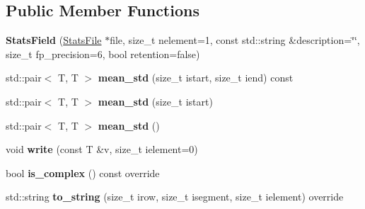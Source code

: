 \subsection*{Public Member Functions}
\begin{DoxyCompactItemize}
\item 
{\bfseries Stats\+Field} (\hyperlink{classStatsFile}{Stats\+File} $\ast$file, size\+\_\+t nelement=1, const std\+::string \&description=\char`\"{}\char`\"{}, size\+\_\+t fp\+\_\+precision=6, bool retention=false)\hypertarget{classStatsField_a93e5b0b232dc5f159b997a2e4ed88fff}{}\label{classStatsField_a93e5b0b232dc5f159b997a2e4ed88fff}

\item 
std\+::pair$<$ T, T $>$ {\bfseries mean\+\_\+std} (size\+\_\+t istart, size\+\_\+t iend) const \hypertarget{classStatsField_a2f7d28bb0e3097b372a3d5229e591e1a}{}\label{classStatsField_a2f7d28bb0e3097b372a3d5229e591e1a}

\item 
std\+::pair$<$ T, T $>$ {\bfseries mean\+\_\+std} (size\+\_\+t istart)\hypertarget{classStatsField_aed72e0d4a119084e39290d63b20e42f3}{}\label{classStatsField_aed72e0d4a119084e39290d63b20e42f3}

\item 
std\+::pair$<$ T, T $>$ {\bfseries mean\+\_\+std} ()\hypertarget{classStatsField_a0ec061f1d2e7daeca2236da89f5eb63c}{}\label{classStatsField_a0ec061f1d2e7daeca2236da89f5eb63c}

\item 
void {\bfseries write} (const T \&v, size\+\_\+t ielement=0)\hypertarget{classStatsField_af78ffa365d95e33f01c7ded2b7880ae7}{}\label{classStatsField_af78ffa365d95e33f01c7ded2b7880ae7}

\item 
bool {\bfseries is\+\_\+complex} () const override\hypertarget{classStatsField_a557ddd81601f7f4f54f20b09221aa2f3}{}\label{classStatsField_a557ddd81601f7f4f54f20b09221aa2f3}

\item 
std\+::string {\bfseries to\+\_\+string} (size\+\_\+t irow, size\+\_\+t isegment, size\+\_\+t ielement) override\hypertarget{classStatsField_a1a96fc4590d08e30f6af400394cc2a5f}{}\label{classStatsField_a1a96fc4590d08e30f6af400394cc2a5f}

\end{DoxyCompactItemize}
